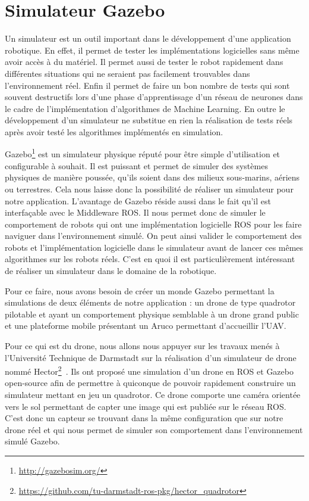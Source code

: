 \section{Simulateur Gazebo}

Un simulateur est un outil important dans le développement d’une application robotique. En effet, il permet de tester les implémentations logicielles sans même avoir accès à du matériel. Il permet aussi de tester le robot rapidement dans différentes situations qui ne seraient pas facilement trouvables dans l’environnement réel. Enfin il permet de faire un bon nombre de tests qui sont souvent destructifs lors d’une phase d’apprentissage d’un réseau de neurones dans le cadre de l’implémentation d’algorithmes de Machine Learning. En outre le développement d’un simulateur ne substitue en rien la réalisation de tests réels après avoir testé les algorithmes implémentés en simulation.

Gazebo\footnote{\url{http://gazebosim.org/}} est un simulateur physique réputé pour être simple d’utilisation et configurable à souhait. Il est puissant et permet de simuler des systèmes physiques de manière poussée, qu’ils soient dans des milieux sous-marins, aériens ou terrestres. Cela nous laisse donc la possibilité de réaliser un simulateur pour notre application. L’avantage de Gazebo réside aussi dans le fait qu’il est interfaçable avec le Middleware ROS. Il nous permet donc de simuler le comportement de robots qui ont une implémentation logicielle ROS pour les faire naviguer dans l’environnement simulé. On peut ainsi valider le comportement des robots et l’implémentation logicielle dans le simulateur avant de lancer ces mêmes algorithmes sur les robots réels. C’est en quoi il est particulièrement intéressant de réaliser un simulateur dans le domaine de la robotique.

Pour ce faire, nous avons besoin de créer un monde Gazebo permettant la simulations de deux éléments de notre application : un drone de type quadrotor pilotable et ayant un comportement physique semblable à un drone grand public et une plateforme mobile présentant un Aruco permettant d'accueillir l’UAV. 

Pour ce qui est du drone, nous allons nous appuyer sur les travaux menés à l’Université Technique de Darmstadt sur la réalisation d’un simulateur de drone nommé Hector\footnote{\url{https://github.com/tu-darmstadt-ros-pkg/hector_quadrotor}}~\cite{Meyer2012ComprehensiveSO}. Ils ont proposé une simulation d’un drone en ROS et Gazebo open-source afin de permettre à quiconque de pouvoir rapidement construire un simulateur mettant en jeu un quadrotor. Ce drone comporte une caméra orientée vers le sol permettant de capter une image qui est publiée sur le réseau ROS. C’est donc un capteur se trouvant dans la même configuration que sur notre drone réel et qui nous permet de simuler son comportement dans l’environnement simulé Gazebo.

